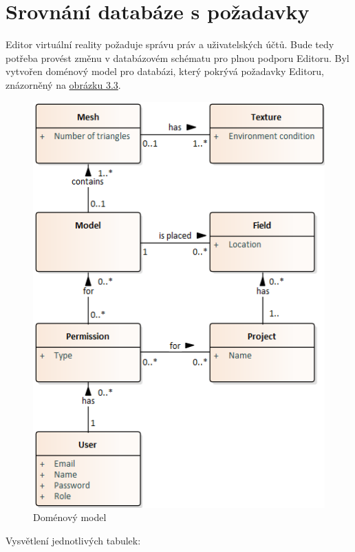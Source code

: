 \documentclass[thesis=B,czech]{FITthesis}[2012/06/26]
\begin{document}
    \section{Srovnání databáze s požadavky}
        Editor virtuální reality požaduje správu práv a uživatelských účtů. Bude tedy potřeba provést změnu v databázovém schématu pro plnou podporu Editoru. Byl vytvořen doménový model pro databázi, který pokrývá požadavky Editoru, znázorněný na \hyperref[fig:domainModel]{obrázku 3.3}.
        \begin{figure}[h!] \label{domainModel}
            \includegraphics[width=\linewidth]{Domain_model}
            \caption{Doménový model}
        \end{figure}
        \newline
        Vysvětlení jednotlivých tabulek:
\end{document}

